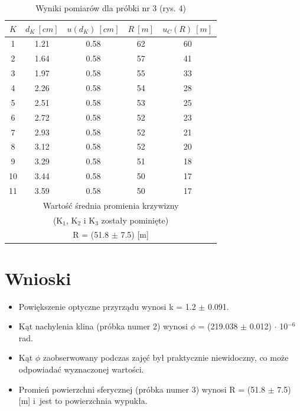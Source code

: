 \documentclass[12pt, a4paper, oneside]{article}
\begin{document}
\begin{table}[h]
  \centering
  \caption{Wyniki pomiarów dla próbki nr 3 (rys. 4)}
    \begin{tabular}{|c|c|c|c|c|}\hline
    $K$ & $d_K~[cm]$ & $u(d_K)~[cm]$ & $R~[m]$ & $u_C(R) ~[m]$ \\\hline
    1 & 1.21 & 0.58 & 62 & 60 \\\hline
    2 & 1.64 & 0.58 & 57 & 41 \\\hline
    3 & 1.97 & 0.58 & 55 & 33 \\\hline
    4 & 2.26 & 0.58 & 54 & 28 \\\hline
    5 & 2.51 & 0.58 & 53 & 25 \\\hline
    6 & 2.72 & 0.58 & 52 & 23 \\\hline
    7 & 2.93 & 0.58 & 52 & 21 \\\hline
    8 & 3.12 & 0.58 & 52 & 20 \\\hline
    9 & 3.29 & 0.58 & 51 & 18 \\\hline
    10 & 3.44 & 0.58 & 50 & 17 \\\hline
    11 & 3.59 & 0.58 & 50 & 17 \\\hline
    \multicolumn{5}{|c|}{Wartość średnia promienia krzywizny} \\\hline
    \multicolumn{5}{|c|}{(K$_1$, K$_2$ i K$_3$ zostały pominięte)} \\\hline
    \multicolumn{5}{|c|}{R = (51.8 $\pm$ 7.5) [m]} \\\hline
    \end{tabular}%
  \label{tab:addlabel}%
\end{table}%

\section{Wnioski}
\begin{itemize}
\item Powiększenie optyczne przyrządu wynosi k = 1.2 $\pm$ 0.091.
\item Kąt nachylenia klina (próbka numer 2) wynosi $\phi$ = (219.038 $\pm$ 0.012) $\cdot$ 10$^{-6}$ rad.
\item Kąt $\phi$ zaobserwowany podczas zajęć był praktycznie niewidoczny, co może odpowiadać wyznaczonej wartości.
\item Promień powierzchni sferycznej (próbka numer 3) wynosi R = (51.8 $\pm$ 7.5) [m] i~jest to powierzchnia wypukła.

\end{itemize}
\end{document}
